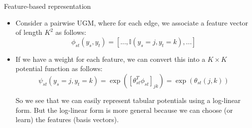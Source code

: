 \documentclass[10pt,mathserif]{beamer}
\begin{document}
\begin{frame}{Feature-based representation}
\begin{itemize}
    \item Consider a pairwise UGM, where for each edge, we associate a feature vector of length $K^2$ as follows:
    \begin{equation}
        \phi_{st}(y_s,y_t) = [...,\mathbb{I}(y_s = j,y_t = k),...]
    \end{equation}
    \item If we have a weight for each feature, we can convert this into a $K \times K$ potential function as follows:
    \begin{equation}
        \psi_{st}(y_s = j,y_t = k) = \exp([\theta_{st}^T\phi_{st}]_{jk}) = \exp(\theta_{st}(j,k))
    \end{equation}
    
    So we see that we can easily represent tabular potentials using a log-linear form. But the log-linear form is more general because we can choose (or learn) the features (basis vectors).
\end{itemize}
\end{frame}


        
        
\end{document}
